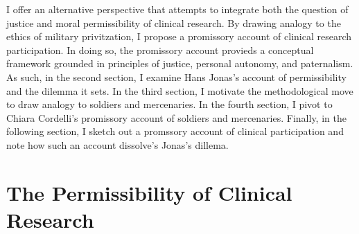 \documentclass[letterpaper,notitlepage,12pt]{article}
\begin{document}
I offer an alternative perspective that attempts to integrate both the question
of justice and moral permissibility of clinical research.
By drawing analogy to the ethics of military privitzation, I propose a
promissory account of clinical research participation.
In doing so, the promissory account provieds a conceptual framework grounded in
principles of justice, personal autonomy, and paternalism.
As such, in the second section, I examine Hans Jonas's account of permissibility
and the dilemma it sets.
In the third section, I motivate the methodological move to draw analogy to
soldiers and mercenaries.
In the fourth section, I pivot to Chiara Cordelli's promissory account of
soldiers and mercenaries.
Finally, in the following section, I sketch out a promssory account of clinical
participation and note how such an account dissolve's Jonas's dillema.

\section{The Permissibility of Clinical Research}









\printbibliography
\end{document}
